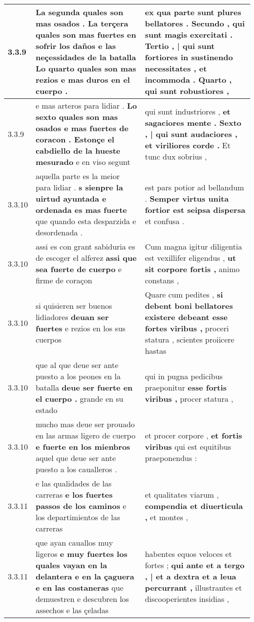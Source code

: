 \begin{tabular}{|p{1cm}|p{6.5cm}|p{6.5cm}|}
3.3.9 & La segunda quales son mas osados . \textbf{ La terçera quales son mas fuertes en sofrir los daños e las neçessidades de la batalla } Lo quarto quales son mas rezios e mas duros en el cuerpo . & ex qua parte sunt plures bellatores . Secundo , \textbf{ qui sunt magis exercitati . Tertio , | qui sunt fortiores in sustinendo necessitates , et incommoda . Quarto , } qui sunt robustiores , \\\hline
3.3.9 & e mas arteros para lidiar . \textbf{ Lo sexto quales son mas osados e mas fuertes de coracon . Estonçe el cabdiello de la hueste mesurado } e en viso segunt & qui sunt industriores , \textbf{ et sagaciores mente . Sexto , | qui sunt audaciores , et viriliores corde . } Et tunc dux sobrius , \\\hline
3.3.10 & aquella parte es la meior para lidiar . \textbf{ s sienpre la uirtud ayuntada e ordenada es mas fuerte } que quando esta desparzida e desordenada . & est pars potior ad bellandum . \textbf{ Semper virtus unita fortior est seipsa dispersa } et confusa . \\\hline
3.3.10 & assi es con grant sabiduria es de escoger el alferez \textbf{ assi que sea fuerte de cuerpo } e firme de coraçon & Cum magna igitur diligentia est vexillifer eligendus , \textbf{ ut sit corpore fortis , } animo constans , \\\hline
3.3.10 & si quisieren ser buenos lidiadores \textbf{ deuan ser fuertes } e rezios en los sus cuerpos & Quare cum pedites , \textbf{ si debent boni bellatores existere debeant esse fortes viribus , } proceri statura , scientes proiicere hastas \\\hline
3.3.10 & que al que deue ser ante puesto a los peones en la batalla \textbf{ deue ser fuerte en el cuerpo . } grande en su estado & qui in pugna pedicibus praeponitur \textbf{ esse fortis viribus , } procer statura , \\\hline
3.3.10 & mucho mas deue ser prouado en las armas ligero de cuerpo \textbf{ e fuerte en los mienbros } aquel que deue ser ante puesto a los caualleros . & et procer corpore , \textbf{ et fortis viribus } qui est equitibus praeponendus : \\\hline
3.3.11 & e las qualidades de las carreras \textbf{ e los fuertes passos de los caminos } e los departimientos de las carreras & et qualitates viarum , \textbf{ compendia et diuerticula , } et montes , \\\hline
3.3.11 & que ayan cauallos muy ligeros \textbf{ e muy fuertes los quales vayan en la delantera e en la çaguera e en las costaneras } que demuestren e descubren los assechos e las çeladas & habentes equos veloces et fortes ; \textbf{ qui ante et a tergo , | et a dextra et a leua percurrant , } illustrantes et discooperientes insidias , \\\hline

\end{tabular}
